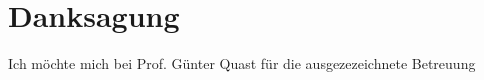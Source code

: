 \chapter*{Danksagung} %

Ich möchte mich bei Prof. Günter Quast für die ausgezezeichnete Betreuung 

\cleardoublepage %
